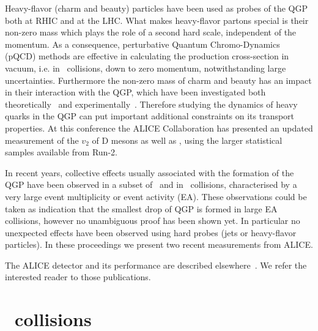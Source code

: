 \documentclass[10pt]{article}
\begin{document}
Heavy-flavor (charm and beauty) particles have been used as probes of the QGP both at RHIC and at the LHC. What makes heavy-flavor partons special is their non-zero mass which plays the role of a second hard scale, independent of the momentum.
As a consequence, perturbative Quantum Chromo-Dynamics (pQCD) methods are effective in calculating the production cross-section in vacuum, i.e. in \pp\ collisions, down to zero momentum, notwithstanding large uncertainties.
Furthermore the non-zero mass of charm and beauty has an impact in their interaction with the QGP, which have been investigated both theoretically~\cite{} and experimentally~\cite{}. 
Therefore studying the dynamics of heavy quarks in the QGP can put important additional constraints on its transport properties.
At this conference the ALICE Collaboration has presented an updated measurement of the $v_2$ of D mesons as well as \jpsi, using the larger statistical samples available from Run-2.

In recent years, collective effects usually associated with the formation of the QGP have been observed in a subset of \pPb\ and in \pp\ collisions, characterised by a very large event multiplicity or event activity (EA). These observations could be taken as indication that the smallest drop
of QGP is formed in large EA collisions, however no unambiguous proof has been shown yet. In particular no unexpected effects have been observed using hard probes (jets or heavy-flavor particles). In these proceedings we present two recent measurements from ALICE.

The ALICE detector and its performance are described elsewhere~\cite{}. We refer the interested reader to those publications.

\section{\PbPb\ collisions}
\end{document}

